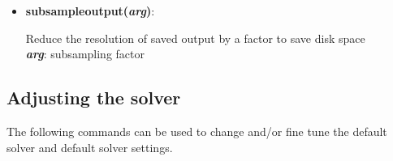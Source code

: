 \begin{itemize}
 \item {\vspace{-0.4cm}\textbf{subsampleoutput(\textit{arg})}:
				\flushright\parbox{0.9 \textwidth}{\vspace{-0.25cm} 
				Reduce the resolution of saved output by a factor to save disk space\\
				\textbf{\textit{arg}}: subsampling factor
				}\flushleft}

\end{itemize}


\subsection{Adjusting the solver}

The following commands can be used to change and/or fine tune the default solver and default solver settings.

